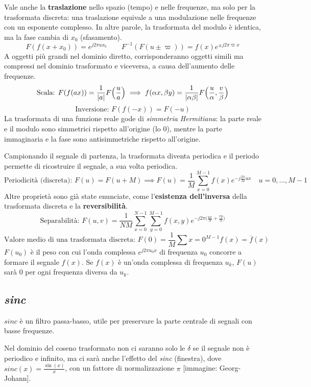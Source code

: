 Vale anche la \textbf{traslazione} nello spazio (tempo) e nelle frequenze, ma solo per la trasformata discreta: una traslazione equivale a una modulazione nelle frequenze con un esponente complesso. In altre parole, la trasformata del modulo è identica, ma la fase cambia di $x_0$ (sfasamento).
$$F(f(x + x_0)) = e^{j2\pi ux_0} \qquad F^{-1}(F(u \pm \varpi)) = f(x)e^{\pm j2\pi \varpi x}$$
A oggetti più grandi nel dominio diretto, corrisponderanno oggetti simili ma compressi nel dominio trasformato e viceversa, a causa dell'aumento delle frequenze. 
$$\text{Scala: } F(f(ax)) = \frac{1}{\left|a\right|} F\Big(\frac{u}{a}\Big) \implies f(\alpha x, \beta y) = \frac{1}{\left|\alpha \beta\right|} F\Big(\frac{u}{\alpha}, \frac{v}{\beta}\Big)$$
$$\text{Inversione: } F(f(-x)) = F(-u)$$
La trasformata di una funzione reale gode di \textit{simmetria Hermitiana}: la parte reale e il modulo sono simmetrici rispetto all'origine (lo 0), mentre la parte immaginaria e la fase sono antisimmetriche rispetto all'origine.

Campionando il segnale di partenza, la trasformata diventa periodica e il periodo permette di ricostruire il segnale, a sua volta periodica. 
$$\text{Periodicità (discreta): } F(u) = F(u + M) \implies F(u) = \frac{1}{M} \sum_{x=0}^{M-1} f(x)e^{-j\frac{2\pi}{M}ux} \quad u = 0, \dots, M - 1$$
Altre proprietà sono già state enunciate, come l'\textbf{esistenza dell'inversa} della trasformata discreta e la \textbf{reversibilità}.
$$\text{Separabilità: } F(u, v) = \frac{1}{NM} \sum_{x=0}^{N-1} \sum_{y=0}^{M-1} f(x, y) e^{-j2\pi \big(\frac{ux}{N} + \frac{vy}{N}\big)}$$
$$\text{Valore medio di una trasformata discreta: } F(0) = \frac{1}{M} \sum{x=0}^{M-1} f(x) = \overline{f}(x)$$
$F(u_0)$ è il peso con cui l'onda complessa $e^{j2\pi u_0x}$ di frequenza $u_0$ concorre a formare il segnale $f(x)$. Se $f(x)$ è un'onda complessa di frequenza $u_k$, $F(u)$ sarà 0 per ogni frequenza diversa da $u_k$.

\subsection{\textit{sinc}}
$sinc$ è un filtro passa-basso, utile per preservare la parte centrale di segnali con basse frequenze. 

Nel dominio del coseno trasformato non ci saranno solo le $\delta$ se il segnale non è periodico e infinito, ma ci sarà anche l'effetto del \textit{sinc} (finestra), dove $sinc(x) = \frac{\sin(x)}{x}$, con un fattore di normalizzazione $\pi$ [immagine: Georg-Johann]. 

